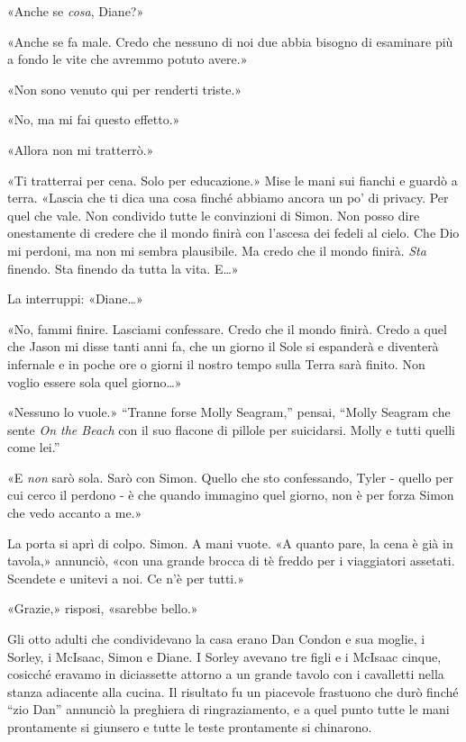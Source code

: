 «Anche se \emph{cosa}, Diane?»

«Anche se fa male. Credo che nessuno di noi due abbia bisogno di
esaminare più a fondo le vite che avremmo potuto avere.»

«Non sono venuto qui per renderti triste.»

«No, ma mi fai questo effetto.»

«Allora non mi tratterrò.»

«Ti tratterrai per cena. Solo per educazione.» Mise le mani sui fianchi
e guardò a terra. «Lascia che ti dica una cosa finché abbiamo ancora un
po' di privacy. Per quel che vale. Non condivido tutte le convinzioni di
Simon. Non posso dire onestamente di credere che il mondo finirà con
l'ascesa dei fedeli al cielo. Che Dio mi perdoni, ma non mi sembra
plausibile. Ma credo che il mondo finirà. \emph{Sta} finendo. Sta
finendo da tutta la vita. E\ldots»

La interruppi: «Diane\ldots»

«No, fammi finire. Lasciami confessare. Credo che il mondo finirà. Credo
a quel che Jason mi disse tanti anni fa, che un giorno il Sole si
espanderà e diventerà infernale e in poche ore o giorni il nostro tempo
sulla Terra sarà finito. Non voglio essere sola quel giorno\ldots»

«Nessuno lo vuole.» ``Tranne forse Molly Seagram,'' pensai, ``Molly
Seagram che sente \emph{On the Beach} con il suo flacone di pillole per
suicidarsi. Molly e tutti quelli come lei.''

«E \emph{non} sarò sola. Sarò con Simon. Quello che sto confessando,
Tyler - quello per cui cerco il perdono - è che quando immagino quel
giorno, non è per forza Simon che vedo accanto a me.»

La porta si aprì di colpo. Simon. A mani vuote. «A quanto pare, la cena
è già in tavola,» annunciò, «con una grande brocca di tè freddo per i
viaggiatori assetati. Scendete e unitevi a noi. Ce n'è per tutti.»

«Grazie,» risposi, «sarebbe bello.»

\separatorefiori

Gli otto adulti che condividevano la casa erano Dan Condon e sua moglie,
i Sorley, i McIsaac, Simon e Diane. I Sorley avevano tre figli e i
McIsaac cinque, cosicché eravamo in diciassette attorno a un grande
tavolo con i cavalletti nella stanza adiacente alla cucina. Il risultato
fu un piacevole frastuono che durò finché ``zio Dan'' annunciò la
preghiera di ringraziamento, e a quel punto tutte le mani prontamente si
giunsero e tutte le teste prontamente si chinarono.

